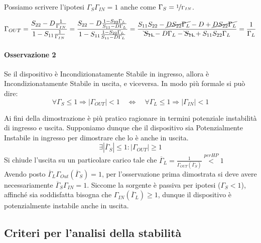 Possiamo scrivere l'ipotesi $\Gamma_S\Gamma_{IN} = 1$ anche come $\Gamma_S = \nicefrac{1}{\Gamma_{IN}}$.

\[
\Gamma_{OUT} =
\frac{S_{22} - D \frac{1}{\Gamma_{IN}}}{1-S_{11} \frac{1}{\Gamma_{IN}}}
=
\frac{S_{22}- D \frac{1-S_{22}\Gamma_L}{S_{11} - D\Gamma_L}}{1-S_{11}\frac{1-S_{22}\Gamma_L}{S_{11} - D\Gamma_L}} =
\frac{S_{11}S_{22} -\cancel{ D S_{22}\Gamma_L} -D+ \cancel{DS_{22}\Gamma_L}}{\bcancel{S_{11}} - D\Gamma_L -\bcancel{S_{11}}+S_{11}S_{22} \Gamma_L}
= \frac{1}{\Gamma_L}
\]



\paragraph{Osservazione 2} Se il dispositivo è Incondizionatamente Stabile in ingresso, allora è Incondizionatamente Stabile in uscita, e viceversa. In modo più formale si può dire:
\[
\forall \Gamma_S \leq 1 \Rightarrow
|\Gamma_{OUT}| <1
\quad
\Leftrightarrow
\quad
\forall \Gamma_L \leq 1 \Rightarrow
|\Gamma_{IN}| <1
\]

Ai fini della dimostrazione è più pratico ragionare in termini potenziale instabilità di ingresso e uscita. Supponiamo dunque che il dispositivo sia Potenzialmente Instabile in ingresso per dimostrare che lo è anche in uscita.
\[
\exists |\overline{\Gamma}_S| \leq 1 : |\Gamma_{OUT}| \geq1
\]
Si chiude l'uscita su un particolare carico tale che $\overline{\Gamma}_L =\frac{1}{\Gamma_{OUT}(\overline{\Gamma}_S)} \overset{per HP}{<} 1$
\\
Avendo posto $\overline{\Gamma}_L \Gamma_{Out}(\overline{\Gamma}_S) = 1$, per l'osservazione prima dimostrata si deve avere necessariamente $\overline{\Gamma}_S \Gamma_{IN} = 1$. Siccome la sorgente è passiva per ipotesi ($\Gamma_S < 1$), affinché sia soddisfatta bisogna che $\Gamma_{IN}(\overline{\Gamma}_L) \geq 1$, dunque il dispositivo è potenzialmente instabile anche in uscita.

\subsection{Criteri per l'analisi della stabilità}

